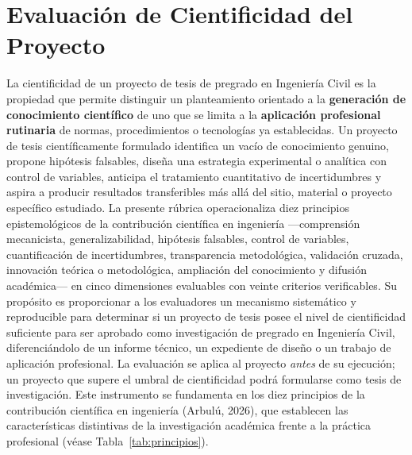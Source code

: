 \clearpage
\section{Evaluación de Cientificidad del Proyecto}

{\footnotesize
La cientificidad de un proyecto de tesis de pregrado en Ingeniería Civil es la propiedad que permite distinguir un planteamiento orientado a la \textbf{generación de conocimiento científico} de uno que se limita a la \textbf{aplicación profesional rutinaria} de normas, procedimientos o tecnologías ya establecidas. Un proyecto de tesis científicamente formulado identifica un vacío de conocimiento genuino, propone hipótesis falsables, diseña una estrategia experimental o analítica con control de variables, anticipa el tratamiento cuantitativo de incertidumbres y aspira a producir resultados transferibles más allá del sitio, material o proyecto específico estudiado. La presente rúbrica operacionaliza diez principios epistemológicos de la contribución científica en ingeniería ---comprensión mecanicista, generalizabilidad, hipótesis falsables, control de variables, cuantificación de incertidumbres, transparencia metodológica, validación cruzada, innovación teórica o metodológica, ampliación del conocimiento y difusión académica--- en cinco dimensiones evaluables con veinte criterios verificables. Su propósito es proporcionar a los evaluadores un mecanismo sistemático y reproducible para determinar si un proyecto de tesis posee el nivel de cientificidad suficiente para ser aprobado como investigación de pregrado en Ingeniería Civil, diferenciándolo de un informe técnico, un expediente de diseño o un trabajo de aplicación profesional. La evaluación se aplica al proyecto \textit{antes} de su ejecución; un proyecto que supere el umbral de cientificidad podrá formularse como tesis de investigación. Este instrumento se fundamenta en los diez principios de la contribución científica en ingeniería (Arbulú, 2026), que establecen las características distintivas de la investigación académica frente a la práctica profesional (véase Tabla~\ref{tab:principios}).\par
}

